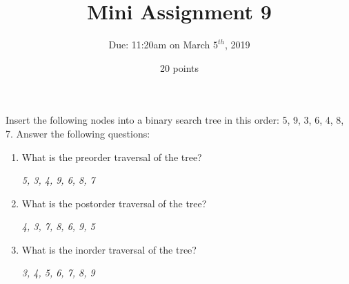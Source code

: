 \documentclass[12pt]{article}
\begin{document}
 
\title{Mini Assignment 9}
\author{Due: 11:20am on March $5^{th}$, 2019}
\date{20 points}
\maketitle

Insert the following nodes into a binary search tree in this order: 5, 9, 3, 6, 4, 8, 7. Answer the following questions:

\begin{enumerate}
	\item What is the preorder traversal of the tree?
	\begin{center}
		\textit{5, 3, 4, 9, 6, 8, 7}
	\end{center}
	\item What is the postorder traversal of the tree?
	\begin{center}
		\textit{4, 3, 7, 8, 6, 9, 5}
	\end{center}
	\item What is the inorder traversal of the tree?
	\begin{center}
		\textit{3, 4, 5, 6, 7, 8, 9}
	\end{center}

\end{enumerate}
\end{document}
